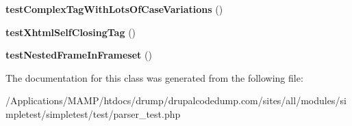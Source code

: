 \begin{DoxyCompactItemize}
\item 
\hypertarget{class_test_of_html_sax_parser_a28bf722c3aadad09a48d2e3c07079bf2}{
{\bfseries testComplexTagWithLotsOfCaseVariations} ()}
\label{class_test_of_html_sax_parser_a28bf722c3aadad09a48d2e3c07079bf2}

\item 
\hypertarget{class_test_of_html_sax_parser_a166eb9c9dfe3193bbd352b008a938b40}{
{\bfseries testXhtmlSelfClosingTag} ()}
\label{class_test_of_html_sax_parser_a166eb9c9dfe3193bbd352b008a938b40}

\item 
\hypertarget{class_test_of_html_sax_parser_a1a0fbdf334749d1454eaa180e571c86b}{
{\bfseries testNestedFrameInFrameset} ()}
\label{class_test_of_html_sax_parser_a1a0fbdf334749d1454eaa180e571c86b}

\end{DoxyCompactItemize}


The documentation for this class was generated from the following file:\begin{DoxyCompactItemize}
\item 
/Applications/MAMP/htdocs/drump/drupalcodedump.com/sites/all/modules/simpletest/simpletest/test/parser\_\-test.php\end{DoxyCompactItemize}
